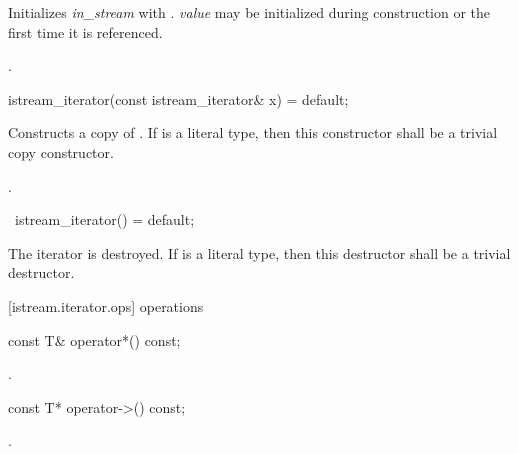 \begin{itemdescr}
\pnum
\effects
Initializes \textit{in_stream} with . \textit{value} may be initialized during
construction or the first time it is referenced.

\pnum
\postcondition {}.
\end{itemdescr}

%
\begin{itemdecl}
istream_iterator(const istream_iterator& x) = default;
\end{itemdecl}

\begin{itemdescr}
\pnum
\effects
Constructs a copy of . If  is a literal type, then this constructor shall be a trivial copy constructor.

\pnum
\postcondition {}.
\end{itemdescr}

%
\begin{itemdecl}
~istream_iterator() = default;
\end{itemdecl}

\begin{itemdescr}
\pnum
\effects
The iterator is destroyed. If  is a literal type, then this destructor shall be a trivial destructor.
\end{itemdescr}

[istream.iterator.ops]{ operations}

%
%
\begin{itemdecl}
const T& operator*() const;
\end{itemdecl}

\begin{itemdescr}
\pnum
\returns
{}.
\end{itemdescr}

%
%
\begin{itemdecl}
const T* operator->() const;
\end{itemdecl}

\begin{itemdescr}
\pnum
\returns
{}.
\end{itemdescr}


